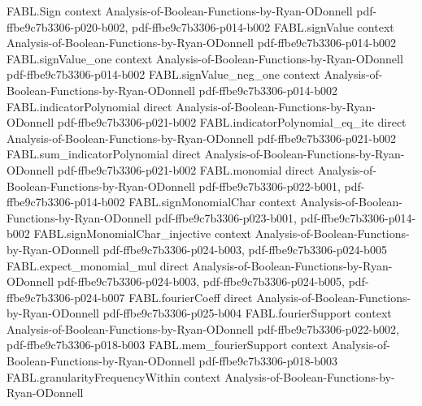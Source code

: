 \begin{theorem}
\label{FABL.covariance_eq_sum_fourierCoeff_mul}
\leanok
{}
\proofstep
  {FABL.Sign}
  {context}
  {Analysis-of-Boolean-Functions-by-Ryan-ODonnell}
  {pdf-ffbe9c7b3306-p020-b002,
    pdf-ffbe9c7b3306-p014-b002}
\proofstep
  {FABL.signValue}
  {context}
  {Analysis-of-Boolean-Functions-by-Ryan-ODonnell}
  {pdf-ffbe9c7b3306-p014-b002}
\proofstep
  {FABL.signValue_one}
  {context}
  {Analysis-of-Boolean-Functions-by-Ryan-ODonnell}
  {pdf-ffbe9c7b3306-p014-b002}
\proofstep
  {FABL.signValue_neg_one}
  {context}
  {Analysis-of-Boolean-Functions-by-Ryan-ODonnell}
  {pdf-ffbe9c7b3306-p014-b002}
\proofstep
  {FABL.indicatorPolynomial}
  {direct}
  {Analysis-of-Boolean-Functions-by-Ryan-ODonnell}
  {pdf-ffbe9c7b3306-p021-b002}
\proofstep
  {FABL.indicatorPolynomial_eq_ite}
  {direct}
  {Analysis-of-Boolean-Functions-by-Ryan-ODonnell}
  {pdf-ffbe9c7b3306-p021-b002}
\proofstep
  {FABL.sum_indicatorPolynomial}
  {direct}
  {Analysis-of-Boolean-Functions-by-Ryan-ODonnell}
  {pdf-ffbe9c7b3306-p021-b002}
\proofstep
  {FABL.monomial}
  {direct}
  {Analysis-of-Boolean-Functions-by-Ryan-ODonnell}
  {pdf-ffbe9c7b3306-p022-b001,
    pdf-ffbe9c7b3306-p014-b002}
\proofstep
  {FABL.signMonomialChar}
  {context}
  {Analysis-of-Boolean-Functions-by-Ryan-ODonnell}
  {pdf-ffbe9c7b3306-p023-b001,
    pdf-ffbe9c7b3306-p014-b002}
\proofstep
  {FABL.signMonomialChar_injective}
  {context}
  {Analysis-of-Boolean-Functions-by-Ryan-ODonnell}
  {pdf-ffbe9c7b3306-p024-b003,
    pdf-ffbe9c7b3306-p024-b005}
\proofstep
  {FABL.expect_monomial_mul}
  {direct}
  {Analysis-of-Boolean-Functions-by-Ryan-ODonnell}
  {pdf-ffbe9c7b3306-p024-b003,
    pdf-ffbe9c7b3306-p024-b005,
    pdf-ffbe9c7b3306-p024-b007}
\proofstep
  {FABL.fourierCoeff}
  {direct}
  {Analysis-of-Boolean-Functions-by-Ryan-ODonnell}
  {pdf-ffbe9c7b3306-p025-b004}
\proofstep
  {FABL.fourierSupport}
  {context}
  {Analysis-of-Boolean-Functions-by-Ryan-ODonnell}
  {pdf-ffbe9c7b3306-p022-b002,
    pdf-ffbe9c7b3306-p018-b003}
\proofstep
  {FABL.mem_fourierSupport}
  {context}
  {Analysis-of-Boolean-Functions-by-Ryan-ODonnell}
  {pdf-ffbe9c7b3306-p018-b003}
\proofstep
  {FABL.granularityFrequencyWithin}
  {context}
  {Analysis-of-Boolean-Functions-by-Ryan-ODonnell}

\end{theorem}
